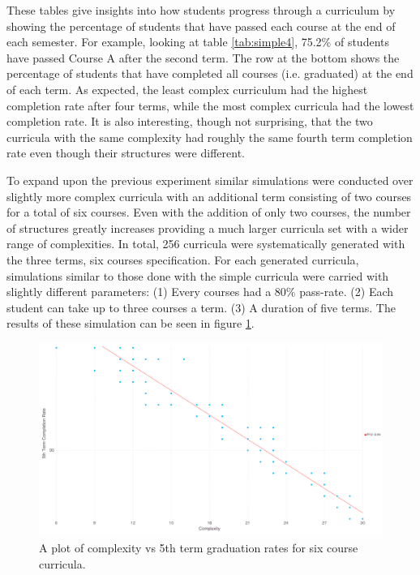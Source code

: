 \documentclass[botnum, fleqn]{unmeethesis}
\begin{document}
    These tables give insights into how students progress through a curriculum by showing the percentage of students that have passed each course at the end of each semester. For example, looking at table \ref{tab:simple4}, 75.2\% of students have passed Course A after the second term. The row at the bottom shows the percentage of students that have completed all courses (i.e. graduated) at the end of each term. As expected, the least complex curriculum had the highest completion rate after four terms, while the most complex curricula had the lowest completion rate. It is also interesting, though not surprising, that the two curricula with the same complexity had roughly the same fourth term completion rate even though their structures were different.

    To expand upon the previous experiment similar simulations were conducted over slightly more complex curricula with an additional term consisting of two courses for a total of six courses. Even with the addition of only two courses, the number of structures greatly increases providing a much larger curricula set with a wider range of complexities. In total, 256 curricula were systematically generated with the three terms, six courses specification. For each generated curricula, simulations similar to those done with the simple curricula were carried with slightly different parameters: (1) Every courses had a 80\% pass-rate. (2) Each student can take up to three courses a term. (3) A duration of five terms. The results of these simulation can be seen in figure \ref{fig:gen6results}.

    \begin{figure}[h!]
      \centerline{\includegraphics[scale=0.25]{./figures/gradRate5_v_complexity_80.png}}
      \caption{A plot of complexity vs 5th term graduation rates for six course curricula.} 
      \label{fig:gen6results}
    \end{figure}
\end{document}
